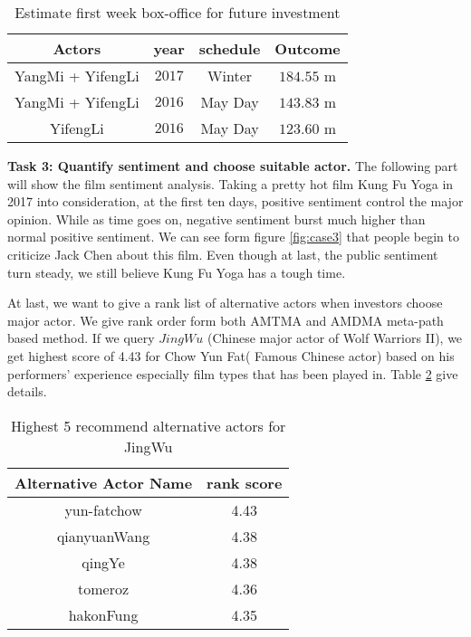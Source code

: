 \begin{table}[!htb]
  \centering
  \begin{tabular}{c|c|c|c}
  \hline
  Actors & year & schedule & Outcome\\
  \hline
  YangMi + YifengLi& $2017$ & Winter & $184.55$ m  \\
  \hline
  YangMi + YifengLi& $2016$ & May Day & $143.83$ m\\
  \hline
  YifengLi& $2016$ & May Day & $123.60$ m\\
  \hline
  \end{tabular}
  \caption{Estimate first week box-office for future investment}
  \label{tab:pred}
\end{table}

\par \textbf{Task 3: Quantify sentiment and choose suitable actor.} The following part will show the film sentiment analysis. Taking a pretty hot film Kung Fu Yoga in 2017 into consideration, at the first ten days, positive sentiment control the major opinion. While as time goes on, negative sentiment burst much higher than normal positive sentiment. We can see form figure \ref{fig:case3} that people begin to criticize Jack Chen about this film. Even though at last, the public sentiment turn steady, we still believe Kung Fu Yoga has a tough time.

At last, we want to give a rank list of alternative actors when investors choose major actor. We give rank order form both AMTMA and AMDMA meta-path based method. If we query $JingWu$ (Chinese major actor of  Wolf Warriors II), we get highest score of 4.43 for Chow Yun Fat( Famous Chinese actor) based on his performers' experience especially film types that has been played in. Table \ref{tab:alter} give details.

\begin{table}[!htb]
  \centering
  \begin{tabular}{c|c}
  \hline
  Alternative Actor Name & rank score\\
  \hline
  yun-fatchow & 4.43  \\
  \hline
  qianyuanWang & 4.38\\
  \hline
  qingYe & 4.38\\
  \hline
  tomeroz & 4.36\\
  \hline
  hakonFung & 4.35\\
  \hline
  \end{tabular}
  \caption{Highest 5 recommend alternative actors for JingWu}
  \label{tab:alter}
\end{table}
